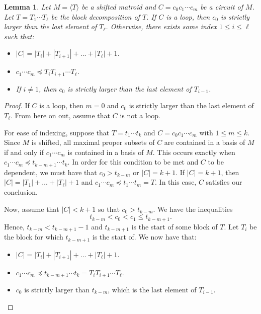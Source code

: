 \documentclass[10pt,a4paper]{amsart}
\theoremstyle{definition}
\theoremstyle{plain}
\newtheorem{lemma}[defn]{Lemma}
\begin{document}
\begin{lemma}
  \label{lem:circuits}
  Let $M= \langle T \rangle$ be a shifted matroid and $C=c_0c_1\cdots c_m$ be a circuit of $M$. Let $T=T_1\cdots T_\ell$ be the block decomposition of $T$. If $C$ is a loop, then $c_0$ is strictly larger than the last element of $T_\ell$. Otherwise, there exists some index $1\leq i \leq \ell$ such that:
  \begin{itemize}
    \item $|C| = |T_{i}|+|T_{i+1}|+\ldots+|T_\ell| +1$.
    \item $c_1\cdots c_m\preceq T_{i}T_{i+1}\cdots T_\ell$.
    \item If $i\neq 1$, then $c_0$ is strictly larger than the last element of $T_{i-1}$.
  \end{itemize}
\end{lemma}
\begin{proof}
  If $C$ is a loop, then $m=0$ and $c_0$ is strictly larger than the last element of $T_\ell$. From here on out, assume that $C$ is not a loop. 

  For ease of indexing, suppose that $T=t_1\cdots t_k$ and $C=c_0c_1\cdots c_m$ with $1\leq m \leq k$. Since $M$ is shifted, all maximal proper subsets of $C$ are contained in a basis of $M$ if and only if $c_1\cdots c_m$ is contained in a basis of $M$. This occurs exactly when $c_1\cdots c_m \preceq t_{k-m+1}\cdots t_{k}$. In order for this condition to be met and $C$ to be dependent, we must have that $c_0 > t_{k-m}$ or $|C|=k+1$. If $|C|=k+1$, then $|C| = |T_1|+\ldots + |T_\ell|+1$ and $c_1\cdots c_m\preceq t_1\cdots t_m = T$.
  In this case, $C$ satisfies our conclusion.

  Now, assume that $|C|<k+1$ so that $c_0> t_{k-m}$. We have the inequalities
  \[t_{k-m}<c_0< c_1 \leq t_{k-m+1}. \]
  Hence, $t_{k-m}< t_{k-m+1}-1$ and $t_{k-m+1}$ is the start of some block of $T$. Let $T_{i}$ be the block for which $t_{k-m+1}$ is the start of. We now have that:
  \begin{itemize}
    \item $|C| = |T_{i}|+|T_{i+1}|+\ldots+|T_\ell| +1$.
    \item $c_1\cdots c_m\preceq t_{k-m+1}\cdots t_k= T_{i}T_{i+1}\cdots T_\ell$.
    \item $c_0$ is strictly larger than $t_{k-m}$, which is the last element of $T_{i-1}$.
  \end{itemize}
\end{proof}
\end{document}
